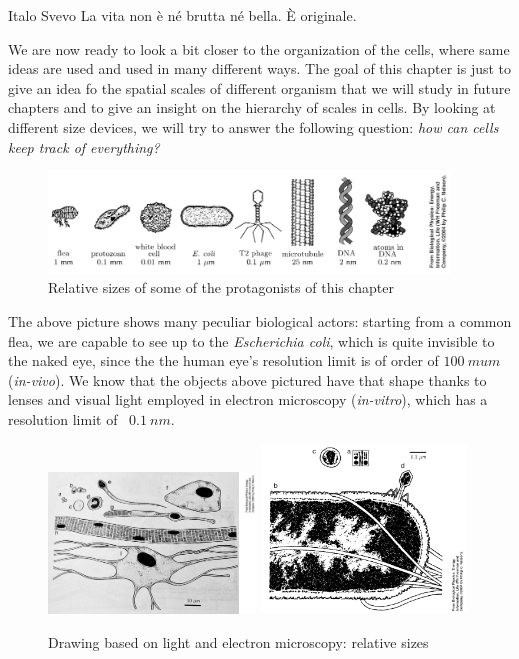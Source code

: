 \documentclass[../main/main.tex]{subfiles}
\begin{document}
\begin{chapquote}{Italo Svevo}
    La vita non è né brutta né bella. È originale.
\end{chapquote}

We are now ready to look a bit closer to the organization of the cells, where same ideas are used and used in many different ways.  The goal of this chapter is just to give an idea fo the spatial scales of different organism that we will study in future chapters and to give an insight on the hierarchy of scales in cells. By looking at different size devices, we will try to answer the following question: \emph{how can cells keep track of everything?}  
\begin{figure}[h!]
    \centering
    \includegraphics[width=0.95\textwidth]{../frontespizio/tikz/1_lesson/spatial_scales.PNG}
    \caption{Relative sizes of some of the protagonists of this chapter}    
\end{figure}
The above picture shows many peculiar biological actors: starting from a common flea, we are capable to see up to the \emph{Escherichia coli}, which is quite invisible to the naked eye, since the the human eye's resolution limit is of order of $100\: mu m$ (\emph{in-vivo}). We know that the objects above pictured have that shape thanks to lenses and visual light employed in electron microscopy (\emph{in-vitro}), which has a resolution limit of ~$0.1\:nm$.

\begin{figure}[h!] 
    \centering
    \includegraphics[width=0.49\textwidth]{../frontespizio/tikz/1_lesson/Drawing.jpg}
    \includegraphics[width=0.49\textwidth]{../frontespizio/tikz/1_lesson/drawing_electron.PNG}
    \caption{\label{fig:2_2} Drawing based on light and electron microscopy: relative sizes} 
\end{figure}
\end{document}
